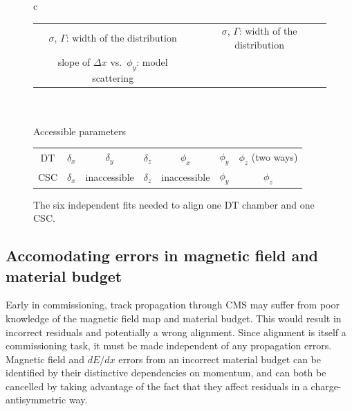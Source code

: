 \documentclass[12pt]{article}
\begin{document}
\begin{figure}
\begin{center}
\begin{tabular}{c}
\begin{tabular}{| c | c |}
$\sigma$, $\Gamma$: width of the distribution & $\sigma$, $\Gamma$: width of the distribution \\
slope of $\Delta x$ vs.~$\phi_y$: model scattering & \\\hline
\end{tabular} \\
\\
Accessible parameters \\
\begin{tabular}{c | c c c c c c}
\hline DT & \hspace{0.6 cm}$\delta_x$\hspace{0.6 cm} & $\delta_y$ & $\delta_z$ & $\phi_x$ & \hspace{0.6 cm}$\phi_y$\hspace{0.6 cm} & $\phi_z$ (two ways) \\
CSC & $\delta_x$ & inaccessible & $\delta_z$ & inaccessible & $\phi_y$ & $\phi_z$ \\
\end{tabular}
\end{tabular}

\end{center}
\caption{The six independent fits needed to align one DT chamber and one CSC. \label{tab:parameters}}
\end{figure}

\subsection{Accomodating errors in magnetic field and material budget}
\label{sec:bfield_errors}

Early in commissioning, track propagation through CMS may suffer from
poor knowledge of the magnetic field map and material budget.  This
would result in incorrect residuals and potentially a wrong alignment.
Since alignment is itself a commissioning task, it must be made
independent of any propagation errors.  Magnetic field and $dE/dx$
errors from an incorrect material budget can be identified by their
distinctive dependencies on momentum, and can both be cancelled by
taking advantage of the fact that they affect residuals in a
charge-antisymmetric way.
\end{document}
